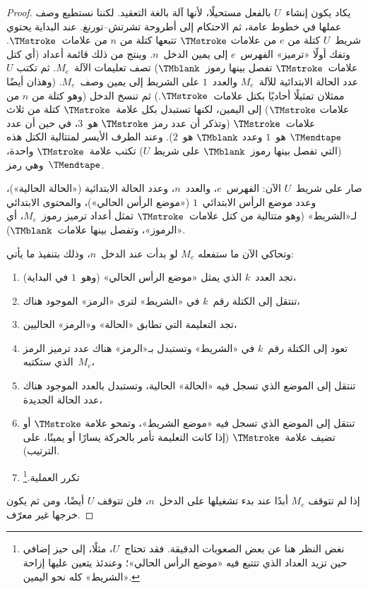 \documentclass[../../../include/open-logic-section]{subfiles}
\begin{document}
\begin{proof}
  يكاد يكون إنشاء~$U$ بالفعل مستحيلًا، لأنها آلة بالغة التعقيد. لكننا
  نستطيع وصف عملها في خطوط عامة، ثم الاحتكام إلى أطروحة
  تشرتش--تورنغ. عند البداية يحتوي شريط~$U$ كتلة من $e$ من علامات
  $\TMstroke$ تتبعها كتلة من $n$ من علامات~$\TMstroke$. وتفك أولًا
  «ترميز» الفهرس~$e$ إلى يمين الدخل~$n$. وينتج من ذلك قائمة أعداد (أي
  كتل علامات~$\TMstroke$ تفصل بينها رموز~$\TMblank$) تصف تعليمات
  الآلة~$M_e$. ثم تكتب $U$ عدد الحالة الابتدائية للآلة~$M_e$ والعدد~$1$
  على الشريط إلى يمين وصف~$M_e$. (وهذان أيضًا ممثلان تمثيلًا أحاديًا
  بكتل علامات~$\TMstroke$.) ثم تنسخ الدخل (وهو كتلة من $n$ من علامات
  $\TMstroke$) إلى اليمين، لكنها تستبدل بكل علامة~$\TMstroke$ كتلة من
  ثلاث علامات~$\TMstroke$ (وتذكر أن عدد رمز $\TMstroke$ هو~$3$، في
  حين أن عدد $\TMendtape$ هو~$1$ وعدد $\TMblank$ هو~$2$). وعند الطرف
  الأيسر لمتتالية الكتل هذه (التي تفصل بينها رموز~$\TMblank$ على شريط
  $U$) تكتب علامة~$\TMstroke$ واحدة، وهي رمز~$\TMendtape$.

  صار على شريط~$U$ الآن: الفهرس~$e$، والعدد~$n$، وعدد الحالة
  الابتدائية («الحالة الحالية»)، وعدد موضع الرأس الابتدائي~$1$ («موضع
  الرأس الحالي»)، والمحتوى الابتدائي لـ«الشريط» (وهو متتالية من كتل
  علامات~$\TMstroke$ تمثل أعداد ترميز رموز~$M_e$، أي «الرموز»، وتفصل
  بينها علامات~$\TMblank$).

  وتحاكي الآن ما ستفعله $M_e$ لو بدأت عند الدخل~$n$، وذلك بتنفيذ ما
  يأتي:
  \begin{enumerate}
    \item تجد العدد~$k$ الذي يمثل «موضع الرأس الحالي» (وهو~$1$ في
    البداية)،
    \item تنتقل إلى الكتلة رقم~$k$ في «الشريط» لترى «الرمز» الموجود
    هناك،
    \item{}%
    تجد التعليمة التي تطابق «الحالة» و«الرمز» الحاليين،
    \item تعود إلى الكتلة رقم~$k$ في «الشريط» وتستبدل بـ«الرمز» هناك
    عدد ترميز الرمز الذي ستكتبه~$M_e$،
    \item تنتقل إلى الموضع الذي تسجل فيه «الحالة» الحالية، وتستبدل
    بالعدد الموجود هناك عدد الحالة الجديدة،
    \item تنتقل إلى الموضع الذي تسجل فيه «موضع الشريط»، وتمحو علامة
    $\TMstroke$ أو تضيف علامة~$\TMstroke$ (إذا كانت التعليمة تأمر
    بالحركة يسارًا أو يمينًا، على الترتيب).
    \item تكرر العملية.\footnote{نغض النظر هنا عن بعض الصعوبات الدقيقة.
    فقد تحتاج~$U$، مثلًا، إلى حيز إضافي حين تزيد العداد الذي تتتبع فيه
    «موضع الرأس الحالي»؛ وعندئذ يتعين عليها إزاحة «الشريط» كله نحو
    اليمين.}
  \end{enumerate}
  إذا لم تتوقف $M_e$ أبدًا عند بدء تشغيلها على الدخل~$n$، فلن تتوقف
  $U$ أيضًا، ومن ثم يكون خرجها غير معرّف.


\end{proof}
\end{document}
